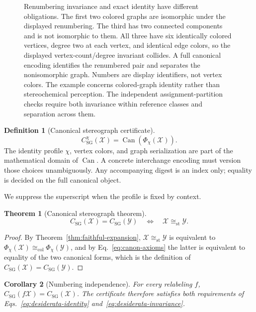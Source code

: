 \documentclass[pdflatex,sn-mathphys-num,referee,lineno]{sn-jnl}
\theoremstyle{plain}
\newtheorem{theorem}{Theorem}
\newtheorem{corollary}[theorem]{Corollary}
\theoremstyle{remark}
\theoremstyle{definition}
\newtheorem{definition}{Definition}
\begin{document}
\begin{figure}[htbp]
  \centering
  \resizebox{\textwidth}{!}{}
  \caption{Renumbering invariance and exact identity have different obligations.
  The first two colored graphs are isomorphic under the displayed renumbering.
  The third has two connected components and is not isomorphic to them.
  All three have six identically colored vertices, degree two at each vertex,
  and identical edge colors, so the displayed vertex-count/degree invariant
  collides. A full canonical encoding identifies the renumbered pair and
  separates the nonisomorphic graph. Numbers are display identifiers, not
  vertex colors. The example concerns colored-graph identity rather than
  stereochemical perception. The independent assignment-partition checks
  require both invariance within reference classes and separation across them.}
  \label{fig:invariant-versus-certificate}
\end{figure}

\begin{definition}[Canonical stereograph certificate]
\[
  C_{\mathrm{SG}}^\chi(\mathcal X)
  =
  \operatorname{Can}\!\left(\Phi_\chi(\mathcal X)\right).
\]
The identity profile \(\chi\), vertex colors, and graph serialization are part
of the mathematical domain of \(\operatorname{Can}\).  A concrete interchange
encoding must version those choices unambiguously.  Any accompanying digest is
an index only; equality is decided on the full canonical object.
\end{definition}
We suppress the superscript when the profile is fixed by context.

\begin{theorem}[Canonical stereograph theorem]
\label{thm:canonical-stereograph}
\[
  C_{\mathrm{SG}}(\mathcal X)=C_{\mathrm{SG}}(\mathcal Y)
  \quad\Longleftrightarrow\quad
  \mathcal X\cong_{\mathrm{st}}\mathcal Y .
\]
\end{theorem}

\begin{proof}
By Theorem~\ref{thm:faithful-expansion},
\(\mathcal X\cong_{\mathrm{st}}\mathcal Y\) is equivalent to
\(\Phi_\chi(\mathcal X)\cong_{\mathrm{col}}\Phi_\chi(\mathcal Y)\), and by
Eq.~\eqref{eq:canon-axioms} the latter is equivalent to equality of the two
canonical forms, which is the definition of
\(C_{\mathrm{SG}}(\mathcal X)=C_{\mathrm{SG}}(\mathcal Y)\).
\end{proof}

\begin{corollary}[Numbering independence]
\label{cor:numbering-independence}
For every relabeling \(f\),
\(C_{\mathrm{SG}}(f\mathcal X)=C_{\mathrm{SG}}(\mathcal X)\).  The certificate
therefore satisfies both requirements of
Eqs.~\eqref{eq:desiderata-identity} and~\eqref{eq:desiderata-invariance}.
\end{corollary}
\end{document}
